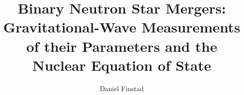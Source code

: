 \documentclass[12pt,notitlepage]{report}
\begin{document}
\Abstract{
}

\title{Binary Neutron Star Mergers: Gravitational-Wave Measurements of their Parameters and the Nuclear Equation of State}
\author{Daniel Finstad}
\officialaprovp
\clearpage
\end{document}
